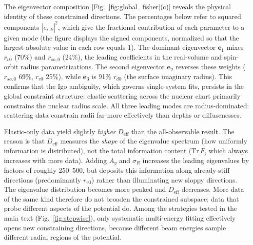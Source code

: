 \documentclass[aps,prl,reprint,superscriptaddress,showpacs,floatfix]{revtex4-2}
\begin{document}
The eigenvector composition [Fig.~\ref{fig:global_fisher}(c)] reveals the physical identity of these constrained directions. The percentages below refer to squared components $|e_{i,k}|^2$, which give the fractional contribution of each parameter to a given mode (the figure displays the signed components, normalized so that the largest absolute value in each row equals 1). The dominant eigenvector $\mathbf{e}_1$ mixes $r_{v0}$ (70\%) and $r_{so,0}$ (24\%), the leading coefficients in the real-volume and spin-orbit radius parametrizations. The second eigenvector $\mathbf{e}_2$ reverses these weights ($r_{so,0}$ 69\%, $r_{v0}$ 25\%), while $\mathbf{e}_3$ is 91\% $r_{d0}$ (the surface imaginary radius). This confirms that the Igo ambiguity, which governs single-system fits, persists in the global constraint structure: elastic scattering across the nuclear chart primarily constrains the nuclear radius scale. All three leading modes are radius-dominated: scattering data constrain radii far more effectively than depths or diffusenesses.

Elastic-only data yield slightly \emph{higher} $D_\mathrm{eff}$ than the all-observable result. The reason is that $D_\mathrm{eff}$ measures the \emph{shape} of the eigenvalue spectrum (how uniformly information is distributed), not the total information content ($\mathrm{Tr}\,F$, which always increases with more data). Adding $A_y$ and $\sigma_R$ increases the leading eigenvalues by factors of roughly 250--500, but deposits this information along already-stiff directions (predominantly $r_{v0}$) rather than illuminating new sloppy directions. The eigenvalue distribution becomes more peaked and $D_\mathrm{eff}$ decreases. More data of the same kind therefore do not broaden the constrained subspace; data that probe different aspects of the potential do. Among the strategies tested in the main text (Fig.~\ref{fig:stepwise}), only systematic multi-energy fitting effectively opens new constraining directions, because different beam energies sample different radial regions of the potential.
\end{document}
